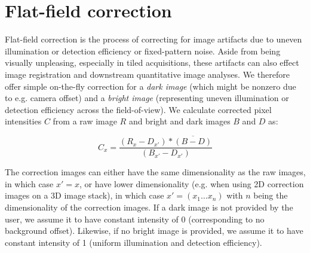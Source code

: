 \begin{comment}
\subsection{Illumination selection}

When imaging large samples with multiple illumination directions,  a lot of unnecessary images are acquired since typically, only illumination from one direction provides optimal images. We therefore implemented a simple \emph{illumination selection} functionality in BigStitcher. It starts by \emph{combining} all (selected) images by their \texttt{Illumination} attribute, i.e. it groups images that share all other attributes besides \texttt{Illumination}. In each of the resulting groups we select a best image. We do this by loading the pixel data for all images in the group at the lowest resolution level (in the case of non-multiresolution images, this corresponds to the original image) and calculating a \emph{quality metric}. We currently offer mean intensity and mean gradient magnitude as quality metrics. The image with the highest score is kept, while all other images are marked as \emph{missing} in the \texttt{SpimData}, which will lead to them being ignored in subsequent processing steps. 
\end{comment}

\section{Flat-field correction}
\label{sec:flatfield}

Flat-field correction is the process of correcting for image artifacts due to uneven illumination or detection efficiency or fixed-pattern noise. Aside from being visually unpleasing, especially in tiled acquisitions, these artifacts can also effect image registration and downstream quantitative image analyses. We therefore offer simple on-the-fly correction for a \emph{dark image} (which might be nonzero due to e.g. camera offset) and a \emph{bright image} (representing uneven illumination or detection efficiency across the field-of-view). We calculate corrected pixel intensities $C$ from a raw image $R$ and bright and dark images $B$ and $D$ as:

\begin{equation}
\label{eq:flatfield-eq1}
C_{x} = \frac{(R_{x} - D_{x'}) * \overline{(B-D)} }{(B_{x'}- D_{x'})}
\end{equation}

The correction images can either have the same dimensionality as the raw images, in which case $x' = x$, or have lower dimensionality (e.g. when using 2D correction images on a 3D image stack), in which case $x' = (x_1 \hdots x_n)$ with $n$ being the dimensionality of the correction images. If a dark image is not provided by the user, we assume it to have constant intensity of 0 (corresponding to no background offset). Likewise, if no bright image is provided, we assume it to have constant intensity of 1 (uniform illumination and detection efficiency). 

